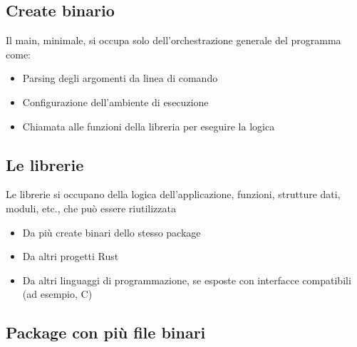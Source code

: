 
\subsection{Create binario}

Il main, minimale, si occupa solo dell'orchestrazione generale del programma come:
\begin{itemize}
  \item Parsing degli argomenti da linea di comando
  \item Configurazione dell'ambiente di esecuzione
  \item Chiamata alle funzioni della libreria per eseguire la logica
\end{itemize}


\subsection{Le librerie}

Le librerie si occupano della logica dell'applicazione, funzioni, strutture dati,
moduli, etc., che può essere riutilizzata

\begin{itemize}
  \item Da più create binari dello stesso package
  \item Da altri progetti Rust
  \item Da altri linguaggi di programmazione, se esposte con interfacce
        compatibili (ad esempio, C)
\end{itemize}




\subsection{Package con più file binari}



